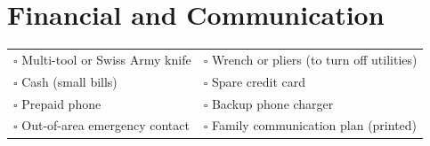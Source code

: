 
\section{Financial and Communication}
\label{sec:finance}

\begin{tabular}{p{9cm} p{9cm}}
$\square$ Multi-tool or Swiss Army knife & $\square$ Wrench or pliers (to turn off utilities) \\ 
$\square$ Cash (small bills) & $\square$ Spare credit card \\ 
$\square$ Prepaid phone & $\square$ Backup phone charger \\ 
$\square$ Out-of-area emergency contact & $\square$ Family communication plan (printed) \\ 
\end{tabular}

